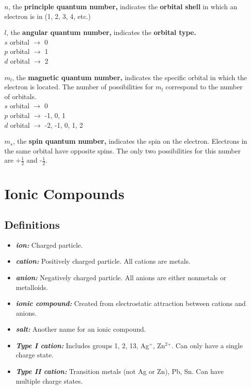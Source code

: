 \documentclass[a4paper, 12pt]{article}
\begin{document}
\textbf{$n$}, the \textbf{principle quantum number,} indicates the \textbf{orbital shell} in which an electron is in (1, 2, 3, 4, etc.)

\textbf{$l$}, the \textbf{angular quantum number,} indicates the \textbf{orbital type.}
\\
$s$ orbital $\xrightarrow{}$ 0
\\
$p$ orbital $\xrightarrow{}$ 1
\\
$d$ orbital $\xrightarrow{}$ 2

\textbf{$m_l$}, the \textbf{magnetic quantum number,} indicates the specific orbital in which the electron is located. The number of possibilities for $m_l$ correspond to the number of orbitals.
\\
$s$ orbital $\xrightarrow{}$ 0
\\
$p$ orbital $\xrightarrow{}$ -1, 0, 1
\\
$d$ orbital $\xrightarrow{}$ -2, -1, 0, 1, 2

\textbf{$m_s$}, the \textbf{spin quantum number,} indicates the spin on the electron. Electrons in the same orbital have opposite spins. The only two possibilities for this number are +$\frac{1}{2}$ and -$\frac{1}{2}$.

\section{Ionic Compounds}

\subsection{Definitions}
\begin{itemize}[leftmargin=*,nosep]
\item \textbf{\emph{ion:}} Charged particle.
\item \textbf{\emph{cation:}} Positively charged particle. All cations are metals.
\item \textbf{\emph{anion:}} Negatively charged particle. All anions are either nonmetals or metalloids.
\item \textbf{\emph{ionic compound:}} Created from electrostatic attraction between cations and anions.
\item \textbf{\emph{salt:}} Another name for an ionic compound.
\item \textbf{\emph{Type I cation:}} Includes groups 1, 2, 13, Ag$^+$, Zn$^{\text{2+}}$. Can only have a single charge state.
\item \textbf{\emph{Type II cation:}} Transition metals (not Ag or Zn), Pb, Sn. Can have multiple charge states.
\end{itemize}
\end{document}
